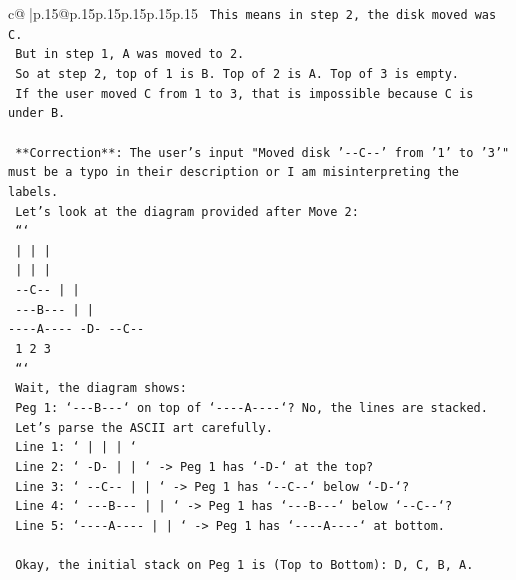 \documentclass{article}
\begin{document}
{\begin{supertabular}{c@{$\;$}|p{.15\linewidth}@{}p{.15\linewidth}p{.15\linewidth}p{.15\linewidth}p{.15\linewidth}p{.15\linewidth}}
{{{\texttt{   This means in step 2, the disk moved was C.} \\
\texttt{   But in step 1, A was moved to 2.} \\
\texttt{   So at step 2, top of 1 is B. Top of 2 is A. Top of 3 is empty.} \\
\texttt{   If the user moved C from 1 to 3, that is impossible because C is under B.} \\
\\ 
\texttt{   **Correction**: The user's input "Moved disk '{-}{-}C{-}{-}' from '1' to '3'" must be a typo in their description or I am misinterpreting the labels.} \\
\texttt{   Let's look at the diagram provided after Move 2:} \\
\texttt{   ```} \\
\texttt{    |         |         |    } \\
\texttt{    |         |         |    } \\
\texttt{  {-}{-}C{-}{-}       |         |    } \\
\texttt{ {-}{-}{-}B{-}{-}{-}      |         |    } \\
\texttt{{-}{-}{-}{-}A{-}{-}{-}{-}    {-}D{-}      {-}{-}C{-}{-}  } \\
\texttt{    1         2         3    } \\
\texttt{   ```} \\
\texttt{   Wait, the diagram shows:} \\
\texttt{   Peg 1: `{-}{-}{-}B{-}{-}{-}` on top of `{-}{-}{-}{-}A{-}{-}{-}{-}`? No, the lines are stacked.} \\
\texttt{   Let's parse the ASCII art carefully.} \\
\texttt{   Line 1: `    |         |         |    `} \\
\texttt{   Line 2: `   {-}D{-}        |         |    ` {-}> Peg 1 has `{-}D{-}` at the top?} \\
\texttt{   Line 3: `  {-}{-}C{-}{-}       |         |    ` {-}> Peg 1 has `{-}{-}C{-}{-}` below `{-}D{-}`?} \\
\texttt{   Line 4: ` {-}{-}{-}B{-}{-}{-}      |         |    ` {-}> Peg 1 has `{-}{-}{-}B{-}{-}{-}` below `{-}{-}C{-}{-}`?} \\
\texttt{   Line 5: `{-}{-}{-}{-}A{-}{-}{-}{-}     |         |    ` {-}> Peg 1 has `{-}{-}{-}{-}A{-}{-}{-}{-}` at bottom.} \\
\\ 
\texttt{   Okay, the initial stack on Peg 1 is (Top to Bottom): D, C, B, A.} \\
}}}
\end{supertabular}}
\end{document}

